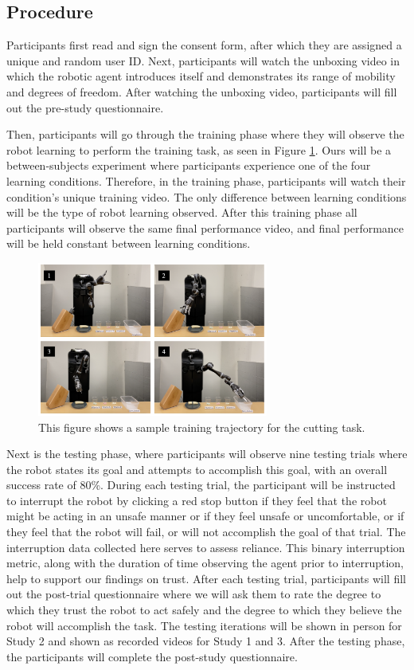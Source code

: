 \documentclass[letterpaper]{article} %
\begin{document}
\subsection{Procedure}
\label{sec:procedure}
Participants first read and sign the consent form, after which they are assigned a unique and random user ID. Next, participants will watch the unboxing video in which the robotic agent introduces itself and demonstrates its range of mobility and degrees of freedom. After watching the unboxing video, participants will fill out the pre-study questionnaire.

Then, participants will go through the training phase where they will observe the robot learning to perform the training task, as seen in Figure \ref{fig:training_flow}. Ours will be a between-subjects experiment where participants experience one of the four learning conditions. Therefore, in the training phase, participants will watch their condition's unique training video. The only difference between learning conditions will be the type of robot learning observed. After this training phase all participants will observe the same final performance video, and final performance will be held constant between learning conditions.

\begin{figure}[ht]
\centering
\includegraphics[width=0.9\columnwidth,height=2.0in ]{Figures/training_flow.png}
\caption{This figure shows a sample training trajectory for the cutting task.}
\label{fig:training_flow}
\end{figure}

Next is the testing phase, where participants will observe nine testing trials where the robot states its goal and attempts to accomplish this goal, with an overall success rate of 80\%. During each testing trial, the participant will be instructed to interrupt the robot by clicking a red stop button if they feel that the robot might be acting in an unsafe manner or if they feel unsafe or uncomfortable, or if they feel that the robot will fail, or will not accomplish the goal of that trial. The interruption data collected here serves to assess reliance. This binary interruption metric, along with the duration of time observing the agent prior to interruption, help to support our findings on trust. After each testing trial, participants will fill out the post-trial questionnaire where we will ask them to rate the degree to which they trust the robot to act safely and the degree to which they believe the robot will accomplish the task. The testing iterations will be shown in person for Study 2 and shown as recorded videos for Study 1 and 3. After the testing phase, the participants will complete the post-study questionnaire.
\end{document}
